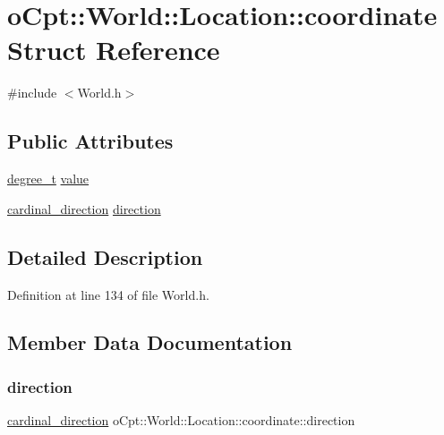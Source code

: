 \hypertarget{structo_cpt_1_1_world_1_1_location_1_1coordinate}{}\section{o\+Cpt\+:\+:World\+:\+:Location\+:\+:coordinate Struct Reference}
\label{structo_cpt_1_1_world_1_1_location_1_1coordinate}


{\ttfamily \#include $<$World.\+h$>$}

\subsection*{Public Attributes}
\begin{DoxyCompactItemize}
\item 
\hyperlink{classo_cpt_1_1_world_1_1_location_a896d36a393f64f80cb4756134477da14}{degree\+\_\+t} \hyperlink{structo_cpt_1_1_world_1_1_location_1_1coordinate_aca0e4502963b1f4149d064833e3a502c}{value}
\item 
\hyperlink{classo_cpt_1_1_world_1_1_location_aa37d99a87b49ccc38470dcc6cc64ced5}{cardinal\+\_\+direction} \hyperlink{structo_cpt_1_1_world_1_1_location_1_1coordinate_ad26574b6dd132610ed3383d52a4fe95f}{direction}
\end{DoxyCompactItemize}


\subsection{Detailed Description}


Definition at line 134 of file World.\+h.



\subsection{Member Data Documentation}
\hypertarget{structo_cpt_1_1_world_1_1_location_1_1coordinate_ad26574b6dd132610ed3383d52a4fe95f}{}\label{structo_cpt_1_1_world_1_1_location_1_1coordinate_ad26574b6dd132610ed3383d52a4fe95f} 
\subsubsection{\texorpdfstring{direction}{direction}}
{\footnotesize\ttfamily \hyperlink{classo_cpt_1_1_world_1_1_location_aa37d99a87b49ccc38470dcc6cc64ced5}{cardinal\+\_\+direction} o\+Cpt\+::\+World\+::\+Location\+::coordinate\+::direction}



